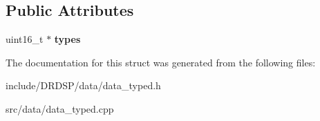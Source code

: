 \subsection*{Public Attributes}
\begin{DoxyCompactItemize}
\item 
\hypertarget{struct_d_r_d_s_p_1_1_data_set_typed_aa1d334ce3351a184e8234276b29d091e}{uint16\-\_\-t $\ast$ {\bfseries types}}\label{struct_d_r_d_s_p_1_1_data_set_typed_aa1d334ce3351a184e8234276b29d091e}

\end{DoxyCompactItemize}


The documentation for this struct was generated from the following files\-:\begin{DoxyCompactItemize}
\item 
include/\-D\-R\-D\-S\-P/data/data\-\_\-typed.\-h\item 
src/data/data\-\_\-typed.\-cpp\end{DoxyCompactItemize}
